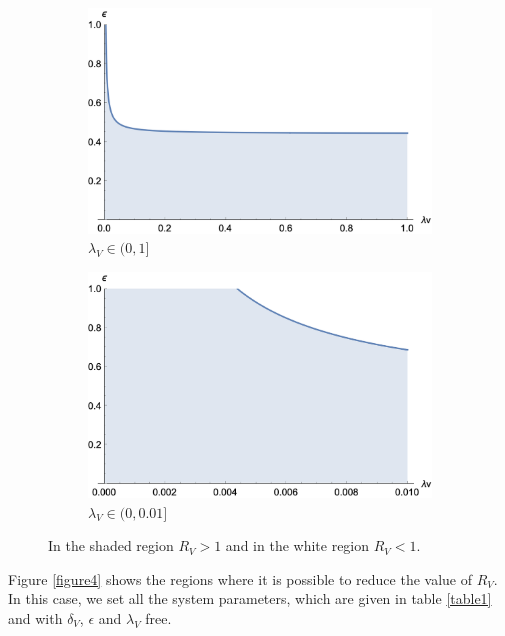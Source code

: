 \documentclass[preprint, sort&compress]{elsarticle}
\begin{document}
\begin{figure}[h!]
\centering
\begin{subfigure}[b]{0.45\linewidth}
\includegraphics[width=\linewidth]{R0-2D-A.png}
\caption{$\lambda_V \in (0,1]$ }
\label{figure3A}
\end{subfigure}
\begin{subfigure}[b]{0.45\linewidth}
\includegraphics[width=\linewidth]{R0-2D-B.png}
\caption{$\lambda_V \in (0,0.01]$ }
\label{figure3B}
\end{subfigure}
\caption{In the shaded region $ R_V> 1 $ and in the white region $ R_V <1 $.}
\label{figure3}
\end{figure}

Figure \ref{figure4} shows the regions where it is possible to reduce the value of $ R_V $. In this case, we set all the system parameters, which are given in table \ref{table1} and with $ \delta_V $, $ \epsilon $ and $ \lambda_V $ free.
\end{document}
